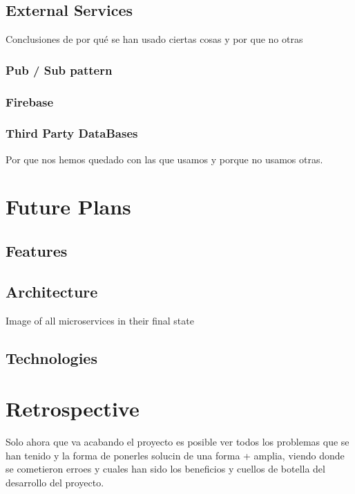 \documentclass[oneside,english,titlepage]{scrbook}
\begin{document}
\section{External Services}

Conclusiones de por qué se han usado ciertas cosas y por que no otras

\subsection{Pub / Sub pattern}

\subsection{Firebase}

\subsection{Third Party DataBases}

Por que nos hemos quedado con las que usamos y porque no usamos otras.

\chapter{Future Plans}

\section{Features}

\section{Architecture}

Image of all microservices in their final state

\section{Technologies}

\chapter{Retrospective}

Solo ahora que va acabando el proyecto es posible ver todos los problemas
que se han tenido y la forma de ponerles solucin de una forma +
amplia, viendo donde se cometieron erroes y cuales han sido los beneficios
y cuellos de botella del desarrollo del proyecto.
\end{document}
